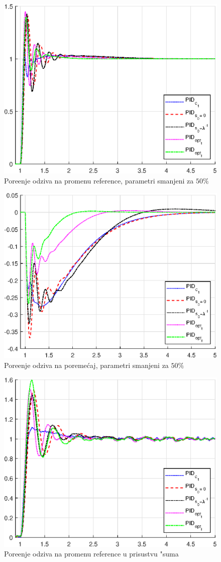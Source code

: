 \documentclass[a4paper,11pt]{article}
\theoremstyle{definition} \newtheorem{deff}{Definicija}[section]
\theoremstyle{definition} \newtheorem{prim}[deff]{Primer}
\theoremstyle{plain} \newtheorem{teor}[deff]{Teorema}
\begin{document}
\begin{figure}[!h]
	\centering
	\includegraphics[width=0.6\linewidth]{slike/Pg_comparison_-50.eps}
	\caption{Pore\dj{}enje odziva na promenu reference, parametri smanjeni za $50\%$}
	\label{fig:Pg_-50}
\end{figure}

\begin{figure}[!h]
	\centering
	\includegraphics[width=0.6\linewidth]{slike/fm_comparison_-50.eps}
	\caption{Pore\dj{}enje odziva na poreme\'caj,
	parametri smanjeni za $50\%$}
	\label{fig:fm_-50}
\end{figure}

\begin{figure}[!h]
	\centering
	\includegraphics[width=0.6\linewidth]{slike/Pg_comparison_noise.eps}
	\caption{Pore\dj{}enje odziva na promenu reference u prisustvu "suma}
	\label{fig:Pg_noise}
\end{figure}
\end{document}
